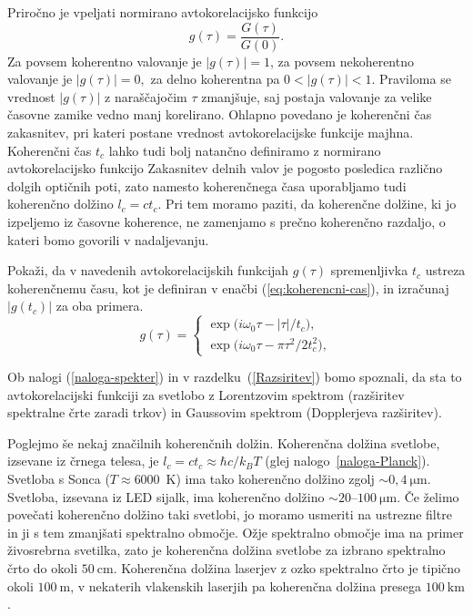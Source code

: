 Priročno je vpeljati normirano avtokorelacijsko funkcijo 
\begin{equation}
g(\tau)=\frac{G(\tau)}{G(0)}.
\label{eq:avtokorelacija-norm}
\end{equation}
Za povsem koherentno valovanje je $|g(\tau)|=1$, za povsem nekoherentno
valovanje je $|g(\tau)|=0,$ za delno koherentna  pa $0<|g(\tau)|<1$.
Praviloma se vrednost $|g(\tau)|$ z naraščajočim $\tau$ zmanjšuje,
saj postaja valovanje za velike časovne zamike vedno manj korelirano.
Ohlapno povedano je koherenčni čas zakasnitev, pri kateri postane
vrednost avtokorelacijske funkcije majhna.
Koherenčni čas $t_{c}$ lahko tudi bolj natančno definiramo 
z normirano avtokorelacijsko funkcijo
Zakasnitev delnih valov je pogosto posledica
različno dolgih optičnih poti, zato namesto koherenčnega časa 
uporabljamo tudi koherenčno dolžino $l_{c}=ct_{c}$. 
Pri tem moramo paziti, da koherenčne dolžine, ki jo izpeljemo iz časovne 
koherence, ne zamenjamo s prečno koherenčno
razdaljo, o kateri bomo govorili v nadaljevanju.

\begin{definition}
Pokaži, da v navedenih avtokorelacijskih
funkcijah $g(\tau)$ spremenljivka $t_{c}$ ustreza koherenčnemu času,
kot je definiran v enačbi (\ref{eq:koherencni-cas}), in izračunaj $|g(t_{c})|$ za oba primera.
\begin{equation}
g(\tau)=\begin{cases}
\exp\big(i\omega_{0}\tau-\left|\tau\right|/t_{c}\big),\\
\exp\big(i\omega_{0}\tau-\pi\tau^{2}/2t_{c}^{2}\big),
\end{cases}
\label{eq:gauss-eksponent}
\end{equation}

Ob nalogi (\ref{naloga-spekter}) in v razdelku~(\ref{Razsiritev}) 
bomo spoznali, da sta to avtokorelacijski
funkciji za svetlobo z Lorentzovim spektrom
(razširitev spektralne črte zaradi trkov) in Gaussovim spektrom
(Dopplerjeva razširitev).
\end{definition}

Poglejmo še nekaj značilnih koherenčnih dolžin. 
Koherenčna dolžina svetlobe, izsevane iz črnega telesa, je $l_{c}=ct_{c}\approx 
\hbar c/k_{B}T$ (glej nalogo~\ref{naloga-Planck}). 
Svetloba s Sonca ($T \approx 6000$~K)
ima tako koherenčno dolžino zgolj $\sim 0,4~\si{\micro\metre}$. Svetloba,
izsevana iz LED sijalk, ima koherenčno dolžino $\sim20$--$100~\si{\micro\metre}$.
Če želimo povečati koherenčno dolžino taki svetlobi, jo moramo usmeriti
na ustrezne filtre in ji s tem zmanjšati spektralno območje.
Ožje spektralno območje ima na primer živosrebrna svetilka, zato je koherenčna
dolžina svetlobe za izbrano spektralno črto do okoli $50~\si{\centi\metre}$.
Koherenčna dolžina laserjev z ozko spektralno črto je tipično okoli
$100~\si{\metre}$, v nekaterih vlakenskih laserjih 
pa koherenčna dolžina presega $100~\si{\kilo\metre}$.

